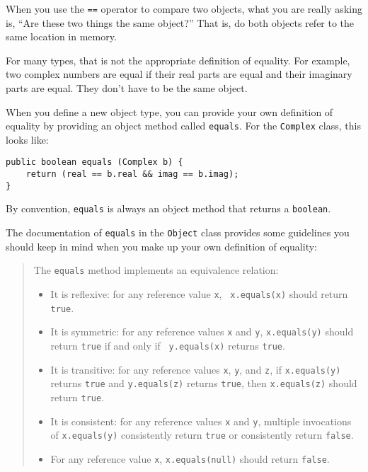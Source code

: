 \documentclass{book}
\begin{document}
When you use the {\tt ==} operator to compare two objects,
what you are really asking is, ``Are these two things the same
object?''  That is, do both objects refer to the same location
in memory.

For many types, that is not the appropriate definition of
equality.  For example, two complex numbers are equal if their
real parts are equal and their imaginary parts are equal.  They
don't have to be the same object.


When you define a new object type, you can provide your own
definition of equality by providing an object method called
{\tt equals}.  For the {\tt Complex} class, this looks like:

\begin{verbatim}
public boolean equals (Complex b) {
    return (real == b.real && imag == b.imag);
}
\end{verbatim}
%
By convention, {\tt equals} is always an object method that
returns a {\tt boolean}.

The documentation of {\tt equals} in the {\tt Object} class
provides some guidelines you should keep in mind when you
make up your own definition of equality:

\begin{quote}

The {\tt equals} method implements an equivalence relation: 


\begin{itemize}

\item It is reflexive: for any reference value {\tt x}, {\tt
x.equals(x)} should return {\tt true}.

\item It is symmetric: for any reference values {\tt x} and {\tt y},
{\tt x.equals(y)} should return {\tt true} if and only if {\tt
y.equals(x)} returns {\tt true}.

\item It is transitive: for any reference values {\tt x}, {\tt y}, and
{\tt z}, if {\tt x.equals(y)} returns {\tt true} and {\tt y.equals(z)}
returns {\tt true}, then {\tt x.equals(z)} should return {\tt true}.

\item It is consistent: for any reference values {\tt x} and {\tt y},
multiple invocations of {\tt x.equals(y)} consistently return {\tt true} or
consistently return {\tt false}.

\item For any reference value {\tt x}, {\tt x.equals(null)} should
return {\tt false}.

\end{itemize}

\end{quote}
\end{document}
